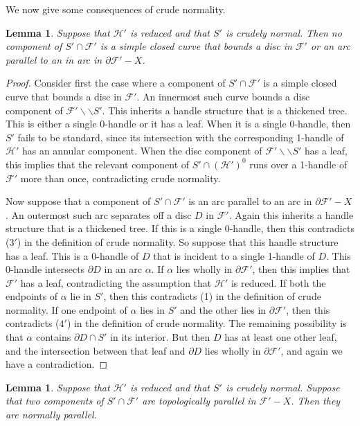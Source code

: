 \documentclass[oneside]{amsart}
\numberwithin{equation}{section}
\theoremstyle{plain}
\newtheorem{lemma}[equation]{Lemma}
\theoremstyle{definition}
\newcommand{\cut}{\backslash\backslash}
\newcommand{\calH}{\mathcal{H}}
\newcommand{\calF}{\mathcal{F}}
\begin{document}
We now give some consequences of crude normality.

\begin{lemma}
\label{Lem:EssentialIntF}
Suppose that $\calH'$ is reduced and that $S'$ is crudely normal. Then no component of
$S' \cap \calF'$ is a simple closed curve that bounds a disc in $\calF'$ or an arc parallel
to an in arc in $\partial \calF' - X$.
\end{lemma}

\begin{proof}
Consider first the case where a component of $S' \cap \calF'$ is a simple closed curve that bounds a disc in $\calF'$.
An innermost such curve bounds a disc component of $\calF' \cut S'$. This inherits a handle structure that is a
thickened tree. This is either a single 0-handle or it has a leaf. When it is a single 0-handle, then $S'$ fails to be
standard, since its intersection with the corresponding 1-handle of $\calH'$ has an annular component.
When the disc component of $\calF' \cut S'$ has a leaf, this implies that the relevant component of $S' \cap (\calH')^0$ runs over a 1-handle of $\calF'$
more than once, contradicting crude normality.

Now suppose that a component of $S' \cap \calF'$ is an arc parallel to an arc in $\partial \calF' - X$. An
outermost such arc separates off a disc $D$ in $\calF'$. Again this inherits a handle structure that is a thickened tree.
If this is a single 0-handle, then this contradicts ($3'$) in the definition of crude normality.
So suppose that this handle structure has a leaf. This is a 0-handle of $D$ that
is incident to a single 1-handle of $D$. This 0-handle intersects $\partial D$ in an arc $\alpha$.
If $\alpha$ lies wholly in $\partial \calF'$, then this implies that $\calF'$ has a leaf, contradicting
the assumption that $\calH'$ is reduced. If both the endpoints of $\alpha$ lie in $S'$, then this
contradicts (1) in the definition of crude normality. If one endpoint of $\alpha$ lies in $S'$
and the other lies in $\partial \calF'$, then this contradicts ($4'$) in the definition of crude
normality. The remaining possibility is that $\alpha$ contains $\partial D \cap S'$ in its
interior. But then $D$ has at least one other leaf, and the intersection between that
leaf and $\partial D$ lies wholly in $\partial \calF'$, and again we have a contradiction.
\end{proof}

\begin{lemma}
\label{Lem:ParallelInF}
Suppose that $\calH'$ is reduced and that $S'$ is crudely normal. Suppose that
two components of $S' \cap \calF'$ are topologically parallel in $\calF' - X$. Then they are
normally parallel.
\end{lemma}
\end{document}
